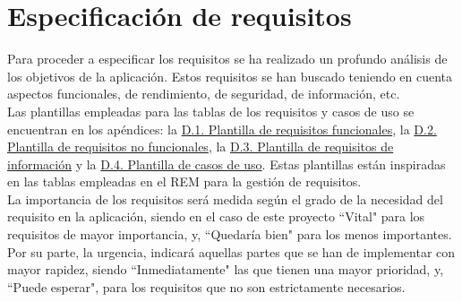 \chapter{Especificación de requisitos}
\label{enlaceespecificacion}

Para proceder a especificar los requisitos se ha realizado un profundo análisis de los objetivos de la aplicación. Estos requisitos se han buscado teniendo en cuenta aspectos funcionales, de rendimiento, de seguridad, de información, etc.
\\

Las plantillas empleadas para las tablas de los requisitos y casos de uso se encuentran en los apéndices: la \hyperref[enlaceFRQX]{D.1. Plantilla de requisitos funcionales}, la \hyperref[enlaceNFRX]{D.2. Plantilla de requisitos no funcionales}, la \hyperref[enlaceIRQX]{D.3. Plantilla de requisitos de información} y la \hyperref[enlaceUCX]{D.4. Plantilla de casos de uso}.
Estas plantillas están inspiradas en las tablas empleadas en el REM \cite{rem} para la gestión de requisitos.
\\

La importancia de los requisitos será medida según el grado de la necesidad del requisito en la aplicación, siendo en el caso de este proyecto ``Vital" para los requisitos de mayor importancia, y, ``Quedaría bien" para los menos importantes. Por su parte, la urgencia, indicará aquellas partes que se han de implementar con mayor rapidez, siendo ``Inmediatamente" las que tienen una mayor prioridad, y, ``Puede esperar", para los requisitos que no son estrictamente necesarios.





